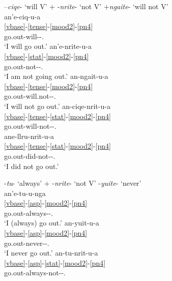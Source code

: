 \documentclass[output=paper]{langscibook}
\begin{document}
\ea\label{ex:key:50}
{–\textit{ciqe}{}- `will V'  + -\textit{nrite}{}- `not V'  \MVRightarrow {} +\textit{ngaite}{}- `will not V' }\\
\ea\label{ex:key:50a}
\glll an'e-ciq-u-a\\
    \ref{vbase}-\ref{tense}-\ref{mood2}-\ref{pn4}\\
     go.out-will-\Ind{}-\Fsg.\Sarg{}\\
\glt `I will go out.'
\ex\label{ex:key:50b}
\glll an'e-nrite-u-a\\
    \ref{vbase}-\ref{stat}-\ref{mood2}-\ref{pn4}\\
     go.out-not-\Ind{}-\Fsg.\Sarg{}\\
\glt `I am not going out.'
\ex\label{ex:key:50c}
\glll an-ngait-u-a\\
    \ref{vbase}-\ref{tense}-\ref{mood2}-\ref{pn4}\\
     go.out-will.not-\Ind{}-\Fsg.\Sarg{}\\
\glt `I will not go out.'
\ex\label{ex:key:50d}
\glll *an-ciqe-nrit-u-a\\
    \ref{vbase}-\ref{tense}-\ref{stat}-\ref{mood2}-\ref{pn4}\\
     go.out-will-not-\Ind{}-\Fsg.\Sarg{}\\
\ex\label{ex:key:50e}
\glll ane-llru-nrit-u-a\\
    \ref{vbase}-\ref{tense}-\ref{stat}-\ref{mood2}-\ref{pn4}\\
     go.out-did-not-\Ind{}-\Fsg.\Sarg{}\\
\glt `I did not go out.'
\z
\z

\ea\label{ex:key:51}
{{}-\textit{tu}{}- `always'  + -\textit{nrite}{}- `not V'  \MVRightarrow {} -\textit{yuite}{}- `never' }\\
\ea\label{ex:key:51a}
\glll an'e-tu-u-nga\\
    \ref{vbase}-\ref{asp}-\ref{mood2}-\ref{pn4}\\
     go.out-always-\Ind{}-\Fsg.\Sarg{}\\
\glt `I (always) go out.'
\ex\label{ex:key:51b}
\glll an-yuit-u-a\\
    \ref{vbase}-\ref{asp}-\ref{mood2}-\ref{pn4} \\
     go.out-never-\Ind{}-\Fsg.\Sarg{}\\
\glt `I never go out.'
\ex\label{ex:key:51c}
\glll *an-tu-nrit-u-a\\
    \ref{vbase}-\ref{asp}-\ref{stat}-\ref{mood2}-\ref{pn4} \\
     go.out-always-not-\Ind{}-\Fsg.\Sarg{} \\
\z
\z
     
\end{document}
